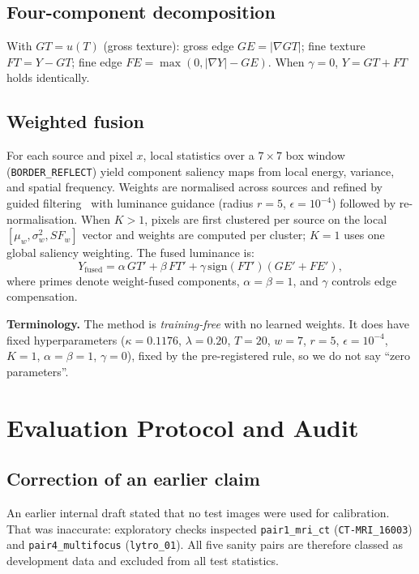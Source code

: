 \documentclass[conference]{IEEEtran}
\begin{document}
\subsection{Four-component decomposition}
With $GT = u(T)$ (gross texture): gross edge $GE = |\nabla GT|$; fine texture $FT = Y - GT$; fine edge $FE = \max(0, |\nabla Y| - GE)$. When $\gamma = 0$, $Y = GT + FT$ holds identically.

\subsection{Weighted fusion}
For each source and pixel $x$, local statistics over a $7 \times 7$ box window (\texttt{BORDER\_REFLECT}) yield component saliency maps from local energy, variance, and spatial frequency. Weights are normalised across sources and refined by guided filtering~\cite{he2013guided} with luminance guidance (radius $r = 5$, $\epsilon = 10^{-4}$) followed by re-normalisation. When $K > 1$, pixels are first clustered per source on the local $[\mu_w, \sigma_w^2, SF_w]$ vector and weights are computed per cluster; $K = 1$ uses one global saliency weighting. The fused luminance is:
\begin{equation}
Y_{\text{fused}} = \alpha\, GT' + \beta\, FT' + \gamma\, \mathrm{sign}(FT')(GE' + FE'),
\end{equation}
where primes denote weight-fused components, $\alpha = \beta = 1$, and $\gamma$ controls edge compensation.

\textbf{Terminology.} The method is \emph{training-free} with no learned weights. It does have fixed hyperparameters ($\kappa=0.1176$, $\lambda=0.20$, $T=20$, $w=7$, $r=5$, $\epsilon=10^{-4}$, $K=1$, $\alpha=\beta=1$, $\gamma=0$), fixed by the pre-registered rule, so we do not say ``zero parameters''.

\section{Evaluation Protocol and Audit}

\subsection{Correction of an earlier claim}
An earlier internal draft stated that no test images were used for calibration. That was inaccurate: exploratory checks inspected \texttt{pair1\_mri\_ct} (\texttt{CT-MRI\_16003}) and \texttt{pair4\_multifocus} (\texttt{lytro\_01}). All five sanity pairs are therefore classed as development data and excluded from all test statistics.
\end{document}
